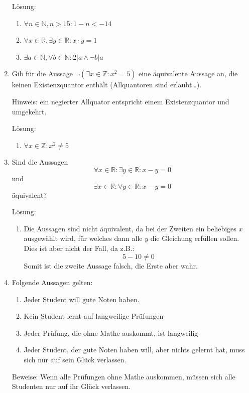 \documentclass[main.tex]{subfiles}
\begin{document}
\begin{enumerate}
	      Lösung:
	      \begin{enumerate}
		      \item \( \forall n \in \mathbb{N}, n > 15 : 1 - n < -14 \)
		      \item \( \forall x \in \mathbb{R}, \exists y \in \mathbb{R} : x \cdot y = 1 \)
		      \item \( \exists a \in \mathbb{N}, \forall b \in \mathbb{N} : 2 | a \land \neg b | a \)
	      \end{enumerate}
	\item Gib für die Aussage \( \neg (\exists x \in \mathbb{Z} : x^2 = 5) \) eine äquivalente Aussage an, die keinen Existenzquantor enthält
	      (Allquantoren sind erlaubt\dots).

	      Hinweis: ein negierter Allquator entspricht einem Existenzquantor und umgekehrt.

	      Lösung:
	      \begin{enumerate}
		      \item \( \forall x \in \mathbb{Z} : x^2 \neq 5 \)
	      \end{enumerate}
	\item Sind die Aussagen
	      \[ \forall x \in \mathbb{R} : \exists y \in \mathbb{R} : x - y = 0 \]
	      und
	      \[ \exists x \in \mathbb{R} : \forall y \in \mathbb{R} : x - y = 0 \]
	      äquivalent?

	      Lösung:
	      \begin{enumerate}
		      \item Die Aussagen sind nicht äquivalent, da bei der Zweiten ein beliebiges \( x \) ausgewählt wird,
		            für welches dann alle \( y \) die Gleichung erfüllen sollen. Dies ist aber nicht der Fall, da z.B.:
		            \[ 5 - 10 \neq 0 \]
		            Somit ist die zweite Aussage falsch, die Erste aber wahr.
	      \end{enumerate}
	\item Folgende Aussagen gelten:
	      \begin{enumerate}
		      \item Jeder Student will gute Noten haben.
		      \item Kein Student lernt auf langweilige Prüfungen
		      \item Jeder Prüfung, die ohne Mathe auskommt, ist langweilig
		      \item Jeder Student, der gute Noten haben will, aber nichts gelernt hat,
		            muss sich nur auf sein Glück verlassen.
	      \end{enumerate}
	      Beweise: Wenn alle Prüfungen ohne Mathe auskommen, müssen sich alle Studenten nur auf ihr Glück verlassen.


\end{enumerate}
\end{document}

